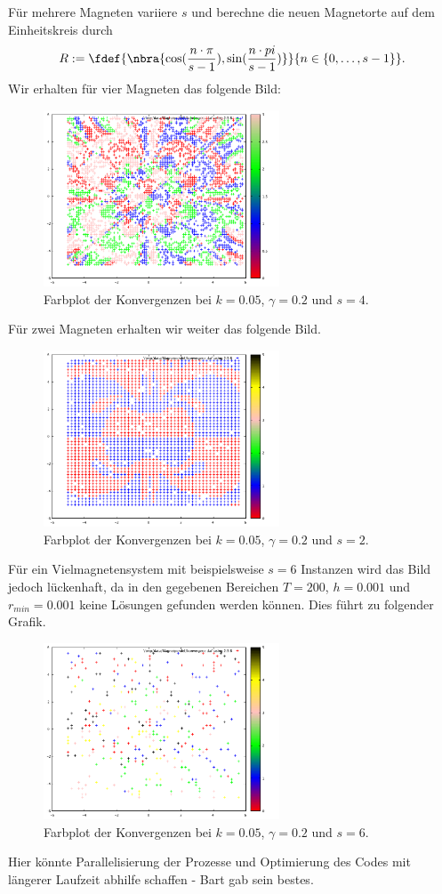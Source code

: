 \documentclass[
    oneside,
    ngerman,
    footinclude=false,
    captions=tableheading,
    DIV=12
]{scrartcl}
\begin{document}
\subaufgabe{}
    Für mehrere Magneten variiere $s$ und berechne die neuen Magnetorte auf dem Einheitskreis durch 
    \[
        R:=\fdef{\nbra{\cos(\frac{n\cdot \pi}{s - 1}),\sin(\frac{n\cdot pi}{s - 1})}}{n\in\{0,\dots,s-1\}}.
    \]
    Wir erhalten für vier Magneten das folgende Bild:
    \begin{figure}[H]
        \centering
        \includegraphics[width=7cm]{../Simulation/img/Farbbild-4Mag0502.png}
        \caption{Farbplot der Konvergenzen bei $k = 0.05$, $\gamma = 0.2$ und $s = 4$.}
    \end{figure}
    Für zwei Magneten erhalten wir weiter das folgende Bild.
    \begin{figure}[H]
        \centering
        \includegraphics[width=7cm]{../Simulation/img/Farbbild-2Mag0502.png}
        \caption{Farbplot der Konvergenzen bei $k = 0.05$, $\gamma = 0.2$ und $s = 2$.}
    \end{figure}
    Für ein Vielmagnetensystem mit beispielsweise $s = 6$ Instanzen wird das Bild jedoch lückenhaft, da in den gegebenen Bereichen $T = 200$, $h = 0.001$ und $r_\textit{min} = 0.001$ keine Lösungen gefunden werden können. Dies führt zu folgender Grafik.
    \begin{figure}[H]
        \centering
        \includegraphics[width=7cm]{../Simulation/img/Farbbild-6Mag0502.png}
        \caption{Farbplot der Konvergenzen bei $k = 0.05$, $\gamma = 0.2$ und $s = 6$.}
    \end{figure}
    Hier könnte Parallelisierung der Prozesse und Optimierung des Codes mit längerer Laufzeit abhilfe schaffen - Bart gab sein bestes. 
\end{document}
